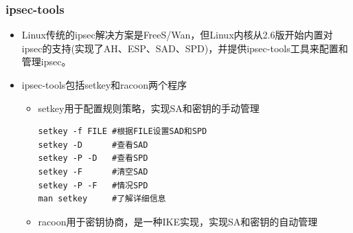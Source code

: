 \documentclass[xcolor=svgnames,presentation]{beamer}
\begin{document}
\begin{frame}[fragile]
\frametitle{ipsec-tools}
\label{sec-4-8}
\begin{itemize}

\item Linux传统的ipsec解决方案是FreeS/Wan，但Linux内核从2.6版开始内置对ipsec的支持(实现了AH、ESP、SAD、SPD)，并提供ipsec-tools工具来配置和管理ipsec。
\label{sec-4-8-1}%

\item ipsec-tools包括setkey和racoon两个程序
\label{sec-4-8-2}%
\begin{itemize}

\item setkey用于配置规则策略，实现SA和密钥的手动管理\\
\label{sec-4-8-2-1}%
\begin{verbatim}
setkey -f FILE #根据FILE设置SAD和SPD
setkey -D      #查看SAD
setkey -P -D   #查看SPD
setkey -F      #清空SAD
setkey -P -F   #情况SPD
man setkey     #了解详细信息
\end{verbatim}

\item racoon用于密钥协商，是一种IKE实现，实现SA和密钥的自动管理
\label{sec-4-8-2-2}%
\end{itemize} %
\end{itemize} %
\end{frame}
\end{document}
